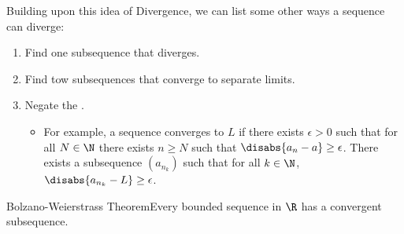 Building upon this idea of Divergence, we can list some other ways a sequence can diverge:
\begin{enumerate}
    \item Find one subsequence that diverges.
    \item Find tow subsequences that converge to separate limits.
    \item Negate the .
          \begin{itemize}
              \item For example, a sequence converges to \(L\) if there exists \(\epsilon > 0\) such that for all \(N \in \N\) there exists \(n \geq N\) such that \(\disabs{a_n - a} \geq \epsilon\). There exists a subsequence \((a_{n_k})\) such that for all \(k \in \N\), \(\disabs{a_{n_k} - L} \geq \epsilon\).
          \end{itemize}
\end{enumerate}

\begin{ntheorem}
    {Bolzano-Weierstrass Theorem}Every bounded sequence in \(\R\) has a convergent subsequence.
\end{ntheorem}

